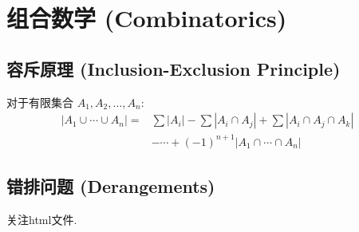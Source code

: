 \documentclass[a4paper,12pt]{ctexart}
\begin{document}
\section{组合数学 (Combinatorics)}

\subsection{容斥原理 (Inclusion-Exclusion Principle)}
对于有限集合 $A_1, A_2, \ldots, A_n$:
\begin{align*}
|A_1 \cup \cdots \cup A_n| = &\sum |A_i| - \sum |A_i \cap A_j| + \sum |A_i \cap A_j \cap A_k| \\
&- \cdots + (-1)^{n+1} |A_1 \cap \cdots \cap A_n|
\end{align*}

\subsection{错排问题 (Derangements)}
关注html文件.
\end{document}
